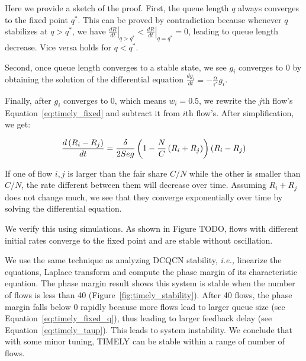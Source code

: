Here we provide a sketch of the proof. First, the queue length $q$ always
converges to the fixed point $q^*$. This can be proved by contradiction because whenever $q$ stabilizes
at $q>q^*$, we have ${\left. {\frac{{dR}}{{dt}}} \right|_{q > {q^*}}} < {\left. {\frac{{dR}}{{dt}}} \right|_{q = {q^*}}} = 0$, 
leading to queue length decrease. Vice versa holds for $q<q^*$. 

Second, once queue length converges to a stable state, we see $g_i$ converges to 0 by obtaining
the solution of the differential equation $\frac{{d{g_i}}}{{dt}} =  - \frac{\alpha }{{{\tau ^*}}}{g_i}$.

Finally, after $g_i$ converges to 0, which means $w_i=0.5$, we rewrite the $j$th flow's Equation~\ref{eq:timely_fixed} 
and subtract it from $i$th flow's. After simplification, we get:

\begin{equation}
\small
\frac{{d\left( {{R_i} - {R_j}} \right)}}{{dt}} = \frac{\delta }{{2Seg}}\left( {1 - \frac{N}{C}\left( {{R_i} + {R_j}} \right)} \right)\left( {{R_i} - {R_j}} \right)
\end{equation}

If one of flow ${i,j}$ is larger than the fair share $C/N$ while the other is smaller than $C/N$,
the rate different between them will decrease over time. Assuming ${{R_i} + {R_j}}$ does not change
much, we see that they converge exponentially over time by solving the differential equation.

We verify this using simulations. As shown in Figure TODO, flows with different initial rates converge 
to the fixed point and are stable without oscillation. 

 We use the same technique as analyzing
DCQCN stability, {\em i.e.,} linearize the equations, Laplace transform and compute the phase margin 
of its characteristic equation. The phase margin result shows this system is stable when the number of 
flows is less than 40 (Figure~\ref{fig:timely_stability}). After 40 flows, the phase margin falls below 
0 rapidly because more flows lead to larger queue size (see Equation~\ref{eq:timely_fixed_q}), 
thus leading to larger feedback delay (see Equation~\ref{eq:timely_taup}). 
This leads to system instability. We conclude that with some minor tuning, TIMELY can be stable 
within a range of number of flows.
